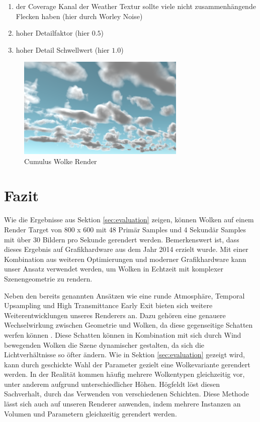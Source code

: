 \begin{enumerate}
    \item der Coverage Kanal der Weather Textur sollte viele nicht zusammenhängende Flecken haben (hier durch Worley Noise)
    \item hoher Detailfaktor (hier $ 0.5 $)
    \item hoher Detail Schwellwert (hier $ 1.0 $)
\end{enumerate}

\begin{figure}[H]
    \centering
    \includegraphics[width=8cm]{figures/cumulus.png}
    \caption{Cumulus Wolke Render}
    \label{fig:cumulus}
\end{figure}

\section{Fazit}
\label{sec:conclusion}

Wie die Ergebnisse aus Sektion \ref{sec:evaluation} zeigen, können Wolken auf einem Render Target von 800 x 600 mit 48 Primär Samples und 4 Sekundär Samples mit  über 30 Bildern pro Sekunde gerendert werden. Bemerkenswert ist, dass dieses Ergebnis auf Grafikhardware aus dem Jahr 2014 erzielt wurde. Mit einer Kombination aus weiteren Optimierungen und moderner Grafikhardware kann unser Ansatz verwendet werden, um Wolken in Echtzeit mit komplexer Szenengeometrie zu rendern.

Neben den bereits genannten Ansätzen wie eine runde Atmosphäre, Temporal Upsampling und High Transmittance Early Exit bieten sich weitere Weiterentwicklungen unseres Renderers an. Dazu gehören eine genauere Wechselwirkung zwischen Geometrie und Wolken, da diese gegenseitige Schatten werfen können \cite{Högfeldt16}. Diese Schatten können in Kombination mit sich durch Wind bewegenden Wolken die Szene dynamischer gestalten, da sich die Lichtverhältnisse so öfter ändern. Wie in Sektion \ref{sec:evaluation} gezeigt wird, kann durch geschickte Wahl der Parameter gezielt eine Wolkevariante gerendert werden. In der Realität kommen häufig mehrere Wolkentypen gleichzeitig vor, unter anderem aufgrund unterschiedlicher Höhen. Högfeldt \cite{Högfeldt16} löst diesen Sachverhalt, durch das Verwenden von verschiedenen Schichten. Diese Methode lässt sich auch auf unseren Renderer anwenden, indem mehrere Instanzen an Volumen und Parametern gleichzeitig gerendert werden.
